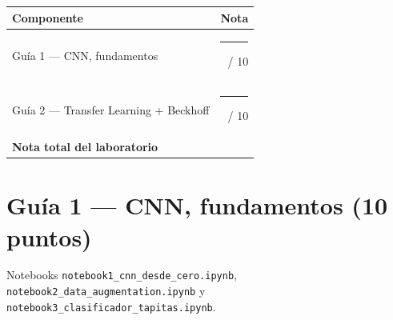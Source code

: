 \vspace{0.5cm}

\begin{center}
\renewcommand{\arraystretch}{1.3}
\begin{tabular}{@{}lr@{}}
\toprule
\textbf{Componente} & \textbf{Nota} \\
\midrule
Guía 1 --- CNN, fundamentos                 & \rule{1.6cm}{0.4pt} / 10 \\
Guía 2 --- Transfer Learning + Beckhoff     & \rule{1.6cm}{0.4pt} / 10 \\
\midrule
\textbf{Nota total del laboratorio}         & \textbf{\rule{1.6cm}{0.4pt} / 20} \\
\bottomrule
\end{tabular}
\renewcommand{\arraystretch}{1}
\end{center}

\section*{Guía 1 --- CNN, fundamentos (10 puntos)}

Notebooks \texttt{notebook1\_cnn\_desde\_cero.ipynb}, \texttt{notebook2\_data\_augmentation.ipynb} y \texttt{notebook3\_clasificador\_tapitas.ipynb}.


